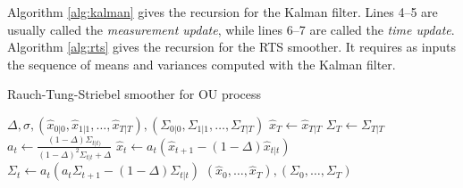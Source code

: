 \documentclass[fleqn]{article}
\begin{document}

Algorithm \ref{alg:kalman} gives the recursion for the Kalman filter. Lines 4--5 are usually called the \emph{measurement update}, while lines 6--7 are called the \emph{time update}. 
Algorithm \ref{alg:rts} gives the recursion for the RTS smoother. It requires as inputs the sequence of means and variances computed with the Kalman filter.

\begin{algorithm}
\caption{Rauch-Tung-Striebel smoother for OU process}
\label{alg:rts}
\begin{algorithmic}[1]
\Require $\Delta, \sigma, (\hat{x}_{0|0}, \hat{x}_{1|1}, \dots, \hat{x}_{T|T}), (\Sigma_{0|0}, \Sigma_{1|1}, \dots, \Sigma_{T|T})$
\State $\hat{x}_T \gets \hat{x}_{T|T}$
\State $\Sigma_T \gets \Sigma_{T|T}$
	\State $a_t \gets \frac{(1-\Delta) \Sigma_{t|t)}}{(1-\Delta)^2 \Sigma_{t|t}+ \Delta}$
	\State $\hat{x}_t \gets a_t (\hat{x}_{t+1} - (1-\Delta)\hat{x}_{t|t})$
	\State $\Sigma_t \gets a_t (a_t \Sigma_{t+1} - (1-\Delta) \Sigma_{t|t})$
\EndFor
\State\Return $(\hat{x}_0, \dots, \hat{x}_T), (\Sigma_0, \dots, \Sigma_T)$
\end{algorithmic}
\end{algorithm}


\end{document}
